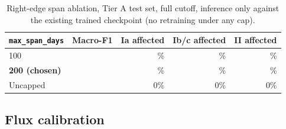 \begin{table}[htb]
\centering
\caption{Right-edge span ablation, Tier A test set, full cutoff, inference
only against the existing trained checkpoint (no retraining under any
cap).}
\label{tab:spanablation}
\begin{tabular}{lrrrr}
\toprule
\texttt{max\_span\_days} & Macro-F1 & Ia affected & Ib/c affected & II affected \\
\midrule
100 & \SpanHundredMacroF{} & \SpanHundredAffectedIa{}\% & \SpanHundredAffectedIbc{}\% & \SpanHundredAffectedII{}\% \\
\textbf{200 (chosen)} & \SpanTwoHundredMacroF{} & \SpanTwoHundredAffectedIa{}\% & \SpanTwoHundredAffectedIbc{}\% & \SpanTwoHundredAffectedII{}\% \\
Uncapped & \SpanUncappedMacroF{} & 0\% & 0\% & 0\% \\
\bottomrule
\end{tabular}
\end{table}

\subsection{Flux calibration}


